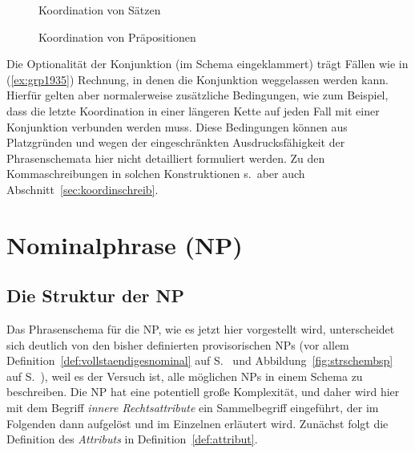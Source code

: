\begin{figure}
  \centering
  \caption{Koordination von Sätzen}
  \label{fig:koorsatz}
\end{figure}

\begin{figure}
  \centering
  \caption{Koordination von Präpositionen}
  \label{fig:koorpraep}
\end{figure}

Die Optionalität der Konjunktion (im Schema eingeklammert) trägt Fällen wie in (\ref{ex:grp1935}) Rechnung, in denen die Konjunktion weggelassen werden kann.
Hierfür gelten aber normalerweise zusätzliche Bedingungen, wie zum Beispiel, dass die letzte Koordination in einer längeren Kette auf jeden Fall mit einer Konjunktion verbunden werden muss.
Diese Bedingungen können aus Platzgründen und wegen der eingeschränkten Ausdrucksfähigkeit der Phrasenschemata hier nicht detailliert formuliert werden.
Zu den Kommaschreibungen in solchen Konstruktionen s.\ aber auch Abschnitt~\ref{sec:koordinschreib}.

\begin{exe}
\end{exe}

\section{Nominalphrase (NP)}

\label{sec:ngr}

\subsection{Die Struktur der NP}

Das Phrasenschema für die NP, wie es jetzt hier vorgestellt wird, unterscheidet sich deutlich von den bisher definierten provisorischen NPs (vor allem Definition~\ref{def:vollstaendigesnominal} auf S.~\pageref{def:vollstaendigesnominal} und Abbildung~\ref{fig:strschembsp} auf S.~\pageref{fig:strschembsp}), weil es der Versuch ist, alle möglichen NPs in einem Schema zu beschreiben.
Die NP hat eine potentiell große Komplexität, und daher wird hier mit dem Begriff \textit{innere Rechtsattribute} ein Sammelbegriff eingeführt, der im Folgenden dann aufgelöst und im Einzelnen erläutert wird.
Zunächst folgt die Definition des \textit{Attributs} in Definition~\ref{def:attribut}.

